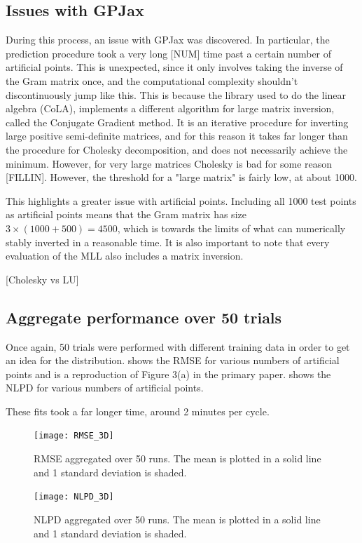 \documentclass[12pt,a4paper,twoside]{report}
\theoremstyle{definition}
\begin{document}
\subsection{Issues with GPJax}
During this process, an issue with GPJax was discovered. In particular, the prediction procedure took a very long [NUM] time past a certain number of artificial points. This is unexpected, since it only involves taking the inverse of the Gram matrix once, and the computational complexity shouldn't discontinuously jump like this. This is because the library used to do the linear algebra (CoLA), implements a different algorithm for large matrix inversion, called the Conjugate Gradient method. It is an iterative procedure for inverting large positive semi-definite matrices, and for this reason it takes far longer than the procedure for Cholesky decomposition, and does not necessarily achieve the minimum. However, for very large matrices Cholesky is bad for some reason [FILLIN]. However, the threshold for a "large matrix" is fairly low, at about 1000.

This highlights a greater issue with artificial points. Including all 1000 test points as artificial points means that the Gram matrix has size $3 \times (1000 + 500)=4500$, which is towards the limits of what can numerically stably inverted in a reasonable time. It is also important to note that every evaluation of the MLL also includes a matrix inversion.

[Cholesky vs LU]

\subsection{Aggregate performance over 50 trials}

Once again, 50 trials were performed with different training data in order to get an idea for the distribution.  shows the RMSE for various numbers of artificial points and is a reproduction of Figure 3(a) in the primary paper.  shows the NLPD for various numbers of artificial points.

These fits took a far longer time, around 2 minutes per cycle.
 
\begin{figure}[ht]
	\centering
	\texttt{[image: RMSE\_3D]}
	\caption[RMSE 3D]{RMSE aggregated over 50 runs. The mean is plotted in a solid line and 1 standard deviation is shaded.}
	\label{rmse3d}
\end{figure}

\begin{figure}[ht]
	\centering
	\texttt{[image: NLPD\_3D]}
	\caption[NLPD 3D]{NLPD aggregated over 50 runs. The mean is plotted in a solid line and 1 standard deviation is shaded.}
	\label{nlpd3d}
\end{figure}
\end{document}
